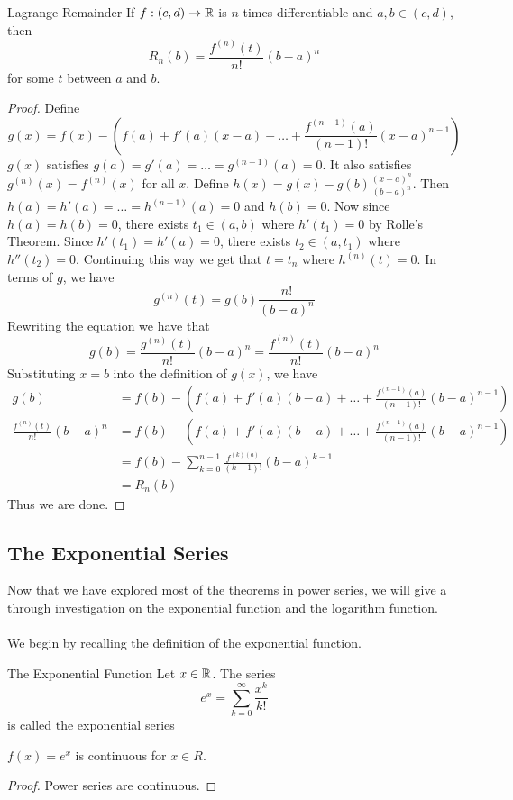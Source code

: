 \documentclass[a4paper]{article}
\begin{document}
\begin{thm}{Lagrange Remainder}{} If $f:(c,d)\to\mathbb{R}$ is $n$ times differentiable and $a,b\in(c,d)$, then $$R_n(b)=\frac{f^{(n)}(t)}{n!}(b-a)^n$$ for some $t$ between $a$ and $b$. \tcbline
\begin{proof} Define $$g(x)=f(x)-\left(f(a)+f'(a)(x-a)+\dots+\frac{f^{(n-1)}(a)}{(n-1)!}(x-a)^{n-1}\right)$$ $g(x)$ satisfies $g(a)=g'(a)=\dots=g^{(n-1)}(a)=0$. It also satisfies $g^{(n)}(x)=f^{(n)}(x)$ for all $x$. Define $h(x)=g(x)-g(b)\frac{(x-a)^n}{(b-a)^n}$. Then $h(a)=h'(a)=\dots=h^{(n-1)}(a)=0$ and $h(b)=0$. Now since $h(a)=h(b)=0$, there exists $t_1\in(a,b)$ where $h'(t_1)=0$ by Rolle's Theorem. Since $h'(t_1)=h'(a)=0$, there exists $t_2\in(a,t_1)$ where $h''(t_2)=0$. Continuing this way we get that $t=t_n$ where $h^{(n)}(t)=0$. In terms of $g$, we have $$g^{(n)}(t)=g(b)\frac{n!}{(b-a)^n}$$ Rewriting the equation we have that $$g(b)=\frac{g^{(n)}(t)}{n!}(b-a)^n=\frac{f^{(n)}(t)}{n!}(b-a)^n$$ Substituting $x=b$ into the definition of $g(x)$, we have 
\begin{align*}
g(b)&=f(b)-\left(f(a)+f'(a)(b-a)+\dots+\frac{f^{(n-1)}(a)}{(n-1)!}(b-a)^{n-1}\right)\\
\frac{f^{(n)}(t)}{n!}(b-a)^n&=f(b)-\left(f(a)+f'(a)(b-a)+\dots+\frac{f^{(n-1)}(a)}{(n-1)!}(b-a)^{n-1}\right)\\
&=f(b)-\sum_{k=0}^{n-1}\frac{f^{(k)(a)}}{(k-1)!}(b-a)^{k-1}\\
&=R_n(b)
\end{align*}
Thus we are done. 
\end{proof}
\end{thm}

\subsection{The Exponential Series}
Now that we have explored most of the theorems in power series, we will give a through investigation on the exponential function and the logarithm function. \\~\\
We begin by recalling the definition of the exponential function. 
\begin{defn}{The Exponential Function}{} Let $x\in\mathbb{R}$. The series $$e^x=\sum_{k=0}^\infty \frac{x^k}{k!}$$ is called the exponential series
\end{defn}

\begin{thm}{}{} $f(x)=e^x$ is continuous for $x\in R$. \tcbline
\begin{proof} Power series are continuous. 
\end{proof}
\end{thm}
\end{document}
